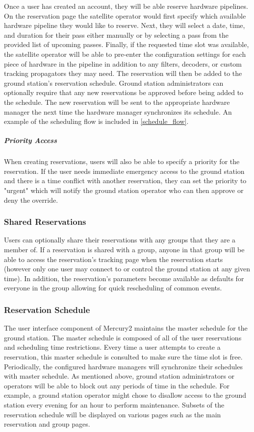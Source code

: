 \documentclass{mxl-design}
\begin{document}
Once a user has created an account, they will be able reserve hardware pipelines. On the reservation page the satellite operator would first specify which available hardware pipeline they would like to reserve. Next, they will select a date, time, and duration for their pass either manually or by selecting a pass from the provided list of upcoming passes. Finally, if the requested time slot was available, the satellite operator will be able to pre-enter the configuration settings for each piece of hardware in the pipeline in addition to any filters, decoders, or custom tracking propagators they may need. The reservation will then be added to the ground station's reservation schedule. Ground station administrators can optionally require that any new reservations be approved before being added to the schedule. The new reservation will be sent to the appropriate hardware manager the next time the hardware manager synchronizes its schedule. An example of the scheduling flow is included in \ref{schedule_flow}.

\subparagraph{Priority Access} When creating reservations, users will also be able to specify a priority for the reservation. If the user needs immediate emergency access to the ground station and there is a time conflict with another reservation, they can set the priority to "urgent" which will notify the ground station operator who can then approve or deny the override.

\subsubsection{Shared Reservations}
Users can optionally share their reservations with any groups that they are a member of. If a reservation is shared with a group, anyone in that group will be able to access the reservation's tracking page when the reservation starts (however only one user may connect to or control the ground station at any given time). In addition, the reservation's parameters become available as defaults for everyone in the group allowing for quick rescheduling of common events.

\subsubsection{Reservation Schedule}
The user interface component of Mercury2 maintains the master schedule for the ground station. The master schedule is composed of all of the user reservations and scheduling time restrictions. Every time a user attempts to create a reservation, this master schedule is consulted to make sure the time slot is free. Periodically, the configured hardware managers will synchronize their schedules with master schedule. As mentioned above, ground station administrators or operators will be able to block out any periods of time in the schedule. For example, a ground station operator might chose to disallow access to the ground station every evening for an hour to perform maintenance. Subsets of the reservation schedule will be displayed on various pages such as the main reservation  and group pages.
 
\end{document}
